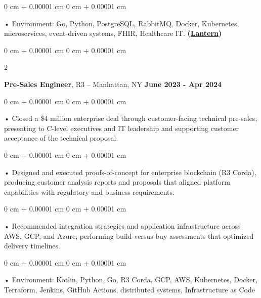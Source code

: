 \documentclass[10pt, letterpaper]{article}
\newenvironment{onecolentry}{
    \begin{adjustwidth}{
        0 cm + 0.00001 cm
    }{
        0 cm + 0.00001 cm
    }
}{
    \end{adjustwidth}
} %
\newenvironment{twocolentry}[2][]{
    \onecolentry
    \def\secondColumn{#2}
    \setcolumnwidth{\fill, 4.5 cm}
    \begin{paracol}{2}
}{
    \switchcolumn \raggedleft \secondColumn
    \end{paracol}
    \endonecolentry
} %
\begin{document}
        \begin{onecolentry}
             • Environment: Go, Python, PostgreSQL, RabbitMQ, Docker, Kubernetes, microservices, event-driven systems, FHIR, Healthcare IT. \textbf{(\href{https://lantern.healthit.gov/?tab=dashboard_tab}{Lantern})}
        \end{onecolentry}
        \vspace{0.1cm}

        \begin{twocolentry}{
            \textbf{June 2023 - Apr 2024}
        }
            \textbf{Pre-Sales Engineer}, R3 -- Manhattan, NY\end{twocolentry}


        \begin{onecolentry}
             • Closed a \$4 million enterprise deal through customer-facing technical pre-sales, presenting to C-level executives and IT leadership and supporting customer acceptance of the technical proposal.
        \end{onecolentry}
        \begin{onecolentry}
             • Designed and executed proofs-of-concept for enterprise blockchain (R3 Corda), producing customer analysis reports and proposals that aligned platform capabilities with regulatory and business requirements.
        \end{onecolentry}
        \begin{onecolentry}
             • Recommended integration strategies and application infrastructure across AWS, GCP, and Azure, performing build-versus-buy assessments that optimized delivery timelines.
        \end{onecolentry}

        \begin{onecolentry}
             • Environment: Kotlin, Python, Go, R3 Corda, GCP, AWS, Kubernetes, Docker, Terraform, Jenkins, GitHub Actions, distributed systems, Infrastructure as Code
        \end{onecolentry}
        \vspace{0.1cm}
\end{document}
